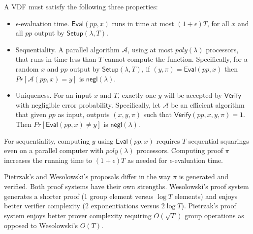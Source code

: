 \documentclass[letterpaper,twocolumn,10pt]{article}
\theoremstyle{definition}
\theoremstyle{remark}
\begin{document}
A VDF must satisfy the following three properties:
\begin{itemize}
\item $\epsilon$-evaluation time. $\mathsf{Eval}(pp, x)$ runs in time at most $(1 + \epsilon) T$, for all $x$ and all $pp$ output by $\mathsf{Setup}(\lambda, T)$.
\item Sequentiality. A parallel algorithm $\mathcal{A}$, using at most $poly(\lambda)$ processors, that runs in time less than $T$ cannot compute the function. Specifically, for a random $x$ and $pp$ output by $\mathsf{Setup}(\lambda, T)$, if $(y, \pi) = \mathsf{Eval}(pp, x)$ then $Pr[\mathcal{A}(pp, x) = y]$ is $\mathsf{negl(\lambda)}$.
\item Uniqueness. For an input $x$ and $T$, exactly one $y$ will be accepted by $\mathsf{Verify}$ with negligible error probability. Specifically, let $\mathcal{A}$ be an efficient algorithm that given $pp$ as input, outputs $(x, y, \pi)$ such that $\mathsf{Verify}(pp, x, y, \pi) = 1$. Then $Pr[\mathsf{Eval}(pp, x) \neq y]$ is $\mathsf{negl(\lambda)}$.
\end{itemize}
For sequentiality, computing $y$ using $\mathsf{Eval}(pp,x)$ requires $T$ sequential squarings even on a parallel computer with $poly(\lambda)$ processors. Computing proof $\pi$ increases the running time to $(1+\epsilon)T$ as needed for $\epsilon$-evaluation time.

Pietrzak's \cite{pietrzak2018simple} and Wesolowski's \cite{wesolowski2019efficient} proposals differ in the way $\pi$ is generated and verified. Both proof systems have their own strengths. Wesolowski's proof system generates a shorter proof (1 group element versus $\log T$ elements) and enjoys better verifier complexity (2 exponentiations versus $2 \log T$). Pietrzak's proof system enjoys better prover complexity requiring $O(\sqrt{T})$ group operations as opposed to Wesolowski's $O(T)$.
\end{document}
